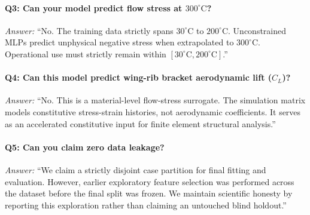 \documentclass[11pt,a4paper]{article}
\begin{document}
\paragraph{Q3: Can your model predict flow stress at $300^\circ\text{C}$?}
\textit{Answer:} ``No. The training data strictly spans $30^\circ\text{C}$ to $200^\circ\text{C}$. Unconstrained MLPs predict unphysical negative stress when extrapolated to $300^\circ\text{C}$. Operational use must strictly remain within $[30^\circ\text{C}, 200^\circ\text{C}]$.''

\paragraph{Q4: Can this model predict wing-rib bracket aerodynamic lift ($C_L$)?}
\textit{Answer:} ``No. This is a material-level flow-stress surrogate. The simulation matrix models constitutive stress-strain histories, not aerodynamic coefficients. It serves as an accelerated constitutive input for finite element structural analysis.''

\paragraph{Q5: Can you claim zero data leakage?}
\textit{Answer:} ``We claim a strictly disjoint case partition for final fitting and evaluation. However, earlier exploratory feature selection was performed across the dataset before the final split was frozen. We maintain scientific honesty by reporting this exploration rather than claiming an untouched blind holdout.''
\end{document}
